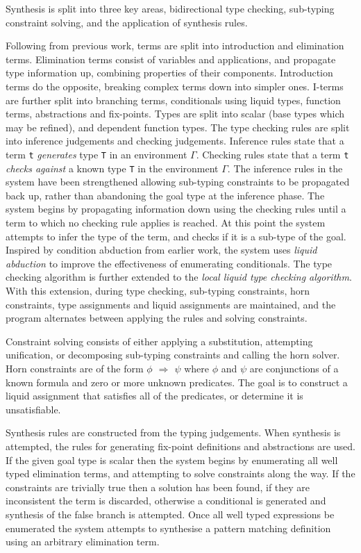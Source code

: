 \documentclass[a4paper]{article}
\begin{document}
Synthesis is split into three key areas, bidirectional type checking, sub-typing constraint solving, and the application of synthesis rules.

Following from previous work, terms are split into introduction and elimination terms. Elimination terms consist of 
variables and applications, and propagate type information up, combining properties of their components. Introduction 
terms do the opposite, breaking complex terms down into simpler ones. I-terms are further split into branching terms, 
conditionals using liquid types, function terms, abstractions and fix-points. Types are split into scalar (base types which may be refined),
and dependent function types. The type checking rules are split into inference judgements and checking judgements. 
Inference rules state that a term \texttt{t} \emph{generates} type \texttt{T} in an environment \(\Gamma\). Checking rules state that a term 
\texttt{t} \emph{checks against} a known type \texttt{T} in the environment \(\Gamma\). The inference rules in the system have been strengthened
allowing sub-typing constraints to be propagated back up, rather than abandoning the goal type at the inference phase.
The system begins by propagating information down using the checking rules until a term to which no checking rule
applies is reached. At this point the system attempts to infer the type of the term, and checks if it is a sub-type of the goal.  
Inspired by condition abduction from earlier work, the system uses \emph{liquid abduction} to improve the effectiveness of 
enumerating conditionals. The type checking algorithm is further extended to the \emph{local liquid type checking algorithm}.
With this extension, during type checking, sub-typing constraints, horn constraints, type assignments and liquid assignments 
are maintained, and the program alternates between applying the rules and solving constraints. 

Constraint solving consists of either applying a substitution, attempting unification, or decomposing sub-typing constraints 
and calling the horn solver. Horn constraints are of the form \emph{\(\phi\) \(\Rightarrow\) \(\psi\)} where \(\phi\) and \(\psi\) are conjunctions of a 
known formula and zero or more unknown predicates. The goal is to construct a liquid assignment that satisfies all of the 
predicates, or determine it is unsatisfiable.  

Synthesis rules are constructed from the typing judgements. When synthesis is attempted, the rules for generating 
fix-point definitions and abstractions are used. If the given goal type is scalar then the system begins by enumerating 
all well typed elimination terms, and attempting to solve constraints along the way. If the constraints are trivially 
true then a solution has been found, if they are inconsistent the term is discarded, otherwise a conditional is generated 
and synthesis of the false branch is attempted. Once all well typed expressions be enumerated the system attempts
to synthesise a pattern matching definition using an arbitrary elimination term.
\end{document}
